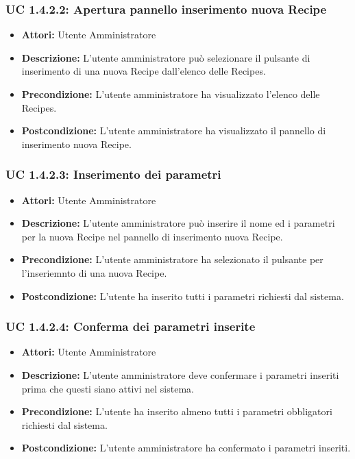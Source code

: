 \subsubsection{UC 1.4.2.2: Apertura pannello inserimento nuova Recipe}

\begin{itemize}
    \item \textbf{Attori:} Utente Amministratore
    \item \textbf{Descrizione:} L'utente amministratore può selezionare il pulsante di inserimento di una nuova Recipe dall'elenco delle Recipes.
    \item \textbf{Precondizione:} L'utente amministratore ha visualizzato l'elenco delle Recipes.
    \item \textbf{Postcondizione:} L'utente amministratore ha visualizzato il pannello di inserimento nuova Recipe.
\end{itemize}

\subsubsection{UC 1.4.2.3: Inserimento dei parametri}

\begin{itemize}
    \item \textbf{Attori:} Utente Amministratore
    \item \textbf{Descrizione:} L'utente amministratore può inserire il nome ed i parametri per la nuova Recipe nel pannello di inserimento nuova Recipe.
    \item \textbf{Precondizione:} L'utente amministratore ha selezionato il pulsante per l'inseriemnto di una nuova Recipe.
    \item \textbf{Postcondizione:} L'utente ha inserito tutti i parametri richiesti dal sistema.
\end{itemize}

\subsubsection{UC 1.4.2.4: Conferma dei parametri inserite}

\begin{itemize}
    \item \textbf{Attori:} Utente Amministratore
    \item \textbf{Descrizione:} L'utente amministratore deve confermare i parametri inseriti prima che questi siano attivi nel sistema.
    \item \textbf{Precondizione:} L'utente ha inserito almeno tutti i parametri obbligatori richiesti dal sistema.
    \item \textbf{Postcondizione:} L'utente amministratore ha confermato i parametri inseriti.
\end{itemize}

